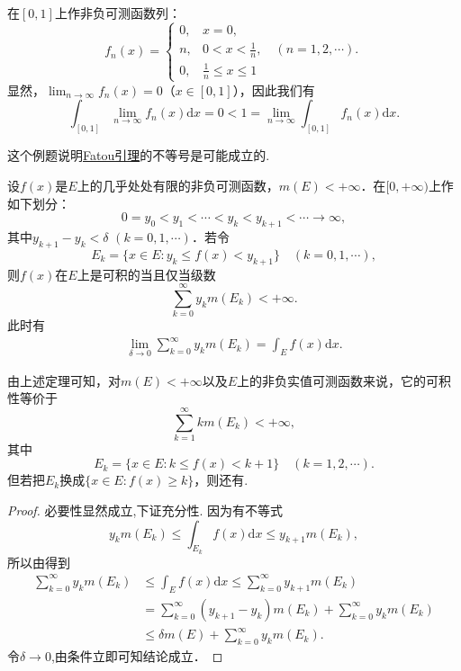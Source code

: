 \documentclass[../../main.tex]{subfiles}
\begin{document}
\begin{example}\label{example:Fatou引理不等号成立的例子}
在\([0, 1]\)上作非负可测函数列：
\[
f_n(x)=
\begin{cases}
0, & x = 0, \\
n, & 0 < x < \frac{1}{n}, \quad (n = 1, 2, \cdots). \\
0, & \frac{1}{n} \leqslant x \leqslant 1
\end{cases}
\]
显然，\(\lim_{n \to \infty} f_n(x) = 0\)（\(x \in [0, 1]\)），因此我们有
\[
\int_{[0, 1]} \lim_{n \to \infty} f_n(x) \mathrm{d}x = 0 < 1 = \lim_{n \to \infty} \int_{[0, 1]} f_n(x) \mathrm{d}x.
\] 
\end{example}
\begin{note}
这个例题说明\hyperref[lemma:Fatou引理]{Fatou引理}的不等号是可能成立的.
\end{note}

\begin{theorem}\label{theorem:函数可积的充要条件1}
设\(f(x)\)是\(E\)上的几乎处处有限的非负可测函数，\(m(E) < +\infty\)．在\([0, +\infty)\)上作如下划分：
\[
0 = y_0 < y_1 < \cdots < y_k < y_{k + 1} < \cdots \to \infty,
\]
其中\(y_{k + 1} - y_k < \delta\) \((k = 0, 1, \cdots)\)．若令
\[
E_k = \{x \in E: y_k \leqslant f(x) < y_{k + 1}\} \quad (k = 0, 1, \cdots),
\]
则\(f(x)\)在\(E\)上是可积的当且仅当级数
\[
\sum_{k = 0}^{\infty} y_k m(E_k) < +\infty.
\]
此时有
\begin{align*}
\lim_{\delta \to 0} \sum_{k = 0}^{\infty} y_k m(E_k) = \int_E f(x) \mathrm{d}x.
\end{align*}
\end{theorem}
\begin{note}
由上述定理可知，对\(m(E) < +\infty\)以及\(E\)上的非负实值可测函数来说，它的可积性等价于
\[
\sum_{k = 1}^{\infty} k m(E_k) < +\infty,
\]
其中
\[
E_k = \{x \in E: k \leqslant f(x) < k + 1\} \quad (k = 1, 2, \cdots).
\]
但若把\(E_k\)换成\(\{x \in E: f(x) \geqslant k\}\)，则还有.
\end{note}
\begin{proof}
必要性显然成立,下证充分性.
因为有不等式
\[
y_k m(E_k) \leqslant \int_{E_k} f(x) \mathrm{d}x \leqslant y_{k + 1} m(E_k),
\]
所以由得到
\begin{align*}
\sum_{k = 0}^{\infty} y_k m(E_k) &\leqslant \int_E f(x) \mathrm{d}x \leqslant \sum_{k = 0}^{\infty} y_{k + 1} m(E_k) \\
&= \sum_{k = 0}^{\infty} (y_{k + 1} - y_k) m(E_k) + \sum_{k = 0}^{\infty} y_k m(E_k) \\
&\leqslant \delta m(E) + \sum_{k = 0}^{\infty} y_k m(E_k).
\end{align*}
令$\delta \to 0$,由条件立即可知结论成立．

\end{proof}
\end{document}

